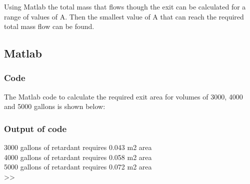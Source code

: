 \noindent Using Matlab the total mass that flows though the exit can be calculated for a range of values of A.
Then the smallest value of A that can reach the required total mass flow can be found.




\subsection{Matlab}
\subsubsection{Code}
The Matlab code to calculate the required exit area for volumes of 3000, 4000 and 5000 gallons is shown below:


\subsubsection{Output of code}

3000 gallons of retardant requires 0.043 m2 area \\
4000 gallons of retardant requires 0.058 m2 area \\
5000 gallons of retardant requires 0.072 m2 area \\
>>
